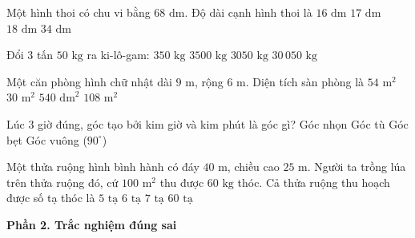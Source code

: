 \begin{ex} %
Một hình thoi có chu vi bằng $68\text{ dm}$. Độ dài cạnh hình thoi là
\choice
{$16\text{ dm}$}
{\True $17\text{ dm}$}
{$18\text{ dm}$}
{$34\text{ dm}$}
\end{ex}

\begin{ex} %
Đổi $3$ tấn $50\text{ kg}$ ra ki-lô-gam:
\choice
{$350\text{ kg}$}
{$3500\text{ kg}$}
{\True $3050\text{ kg}$}
{$30\,050\text{ kg}$}
\end{ex}

\begin{ex} %
Một căn phòng hình chữ nhật dài $9\text{ m}$, rộng $6\text{ m}$. Diện tích sàn phòng là
\choice
{\True $54\text{ m}^2$}
{$30\text{ m}^2$}
{$540\text{ dm}^2$}
{$108\text{ m}^2$}
\end{ex}

\begin{ex} %
Lúc 3 giờ đúng, góc tạo bởi kim giờ và kim phút là góc gì?
\choice
{Góc nhọn}
{Góc tù}
{Góc bẹt}
{\True Góc vuông ($90^\circ$)}
\end{ex}

\begin{ex} %
Một thửa ruộng hình bình hành có đáy $40\text{ m}$, chiều cao $25\text{ m}$. Người ta trồng lúa trên thửa ruộng đó, cứ $100\text{ m}^2$ thu được $60\text{ kg}$ thóc. Cả thửa ruộng thu hoạch được số tạ thóc là
\choice
{$5\text{ tạ}$}
{\True $6\text{ tạ}$}
{$7\text{ tạ}$}
{$60\text{ tạ}$}
\end{ex}

\textbf{Phần 2. Trắc nghiệm đúng sai}

